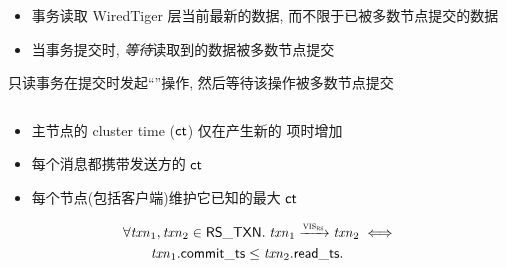 \begin{frame}{}
  
\end{frame}

\begin{frame}{}
  \begin{center}

	\vspace{0.30cm}
	\begin{itemize}
	  \item 事务读取 WiredTiger 层当前最新的数据, 而不限于已被多数节点提交的数据
	  \item 当事务提交时, \emph{等待}读取到的数据被多数节点提交
	\end{itemize}

	\pause
	\vspace{0.10cm}
	只读事务在提交时发起``\noop''操作, 然后等待该操作被多数节点提交
  \end{center}
\end{frame}

\begin{frame}{}

  \begin{columns}
	  
  \end{columns}

  \pause
  \vspace{0.30cm}
  \begin{center}
	\begin{itemize}
	  \setlength{\itemsep}{6pt}
	  \item 主节点的 cluster time ($\sf ct$) 仅在产生新的 \oplog{} 项时增加
	  \item 每个消息都携带发送方的 $\sf ct$
	  \item 每个节点(包括客户端)维护它已知的最大 $\sf ct$
	\end{itemize}
  \end{center}
\end{frame}

\begin{frame}{}
  \begin{definition}
	\vspace{-0.30cm}
	\begin{align*}
      &\forall \mathit{txn}_{1}, \mathit{txn}_{2} \in {\sf RS\_TXN}.\;
        \mathit{txn}_{1} \xrightarrow{\textsc{vis}_{\textsc{rs}}} \mathit{txn}_{2} \iff \\
        &\qquad \mathit{txn}_{1}.{\sf commit\_ts} \le \mathit{txn}_{2}.{\sf read\_ts}.
	\end{align*}
  \end{definition}
\end{frame}

